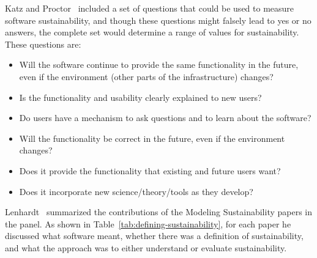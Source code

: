\documentclass[11pt, oneside]{amsart}
\begin{document}
Katz and Proctor~\cite{Katz_WSSSPE} included a set of questions that could be
used to measure software sustainability, and though these questions might
falsely lead to yes or no answers, the complete set would determine a range of
values for sustainability. These questions are:
\begin{itemize}
\item Will the software continue to provide the same functionality in the future,
      even if the environment (other parts of the infrastructure) changes?
\item Is the functionality and usability clearly explained to new users?
\item Do users have a mechanism to ask questions and to learn about the software?
\item Will the functionality be correct in the future, even if the environment changes?
\item Does it provide the functionality that existing and future users want?
\item Does it incorporate new science/theory/tools as they develop?
\end{itemize}

Lenhardt~\cite{lenhardt-wssspe1-panel} summarized the contributions of the
Modeling Sustainability papers in the panel. As shown in
Table~\ref{tab:defining-sustainability}, for each paper he discussed what
software meant, whether there was a definition of sustainability, and what the
approach was to either understand or evaluate sustainability.
\end{document}
